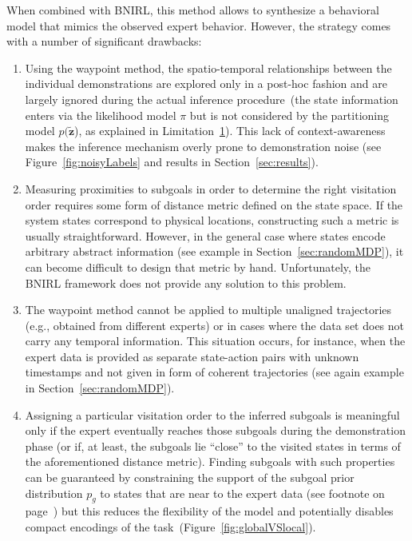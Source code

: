 \documentclass[twoside,11pt]{article}
\newcommand{\first}{(i)}
\newcommand{\second}{(ii)}
\newcommand{\third}{(iii)}
\newcommand{\fourth}{(iv)}
\newcommand{\eg}{e.g.}
\begin{document}
When combined with BNIRL, this method allows to synthesize a behavioral model that %
mimics the observed expert behavior. However, the strategy comes with a number of significant drawbacks: 
\begin{enumerate}
\item[\first] Using the waypoint method, the spatio-temporal %
%
relationships between the individual demonstrations are
explored only in a post-hoc fashion and %
are largely ignored during the actual inference procedure~(the state information enters via the likelihood model $\pi$ but is not considered by the partitioning %
model $p(\mathbf{\tilde{z}}$), as explained in Limitation~\hyperref[phantom:lim1]{1}). %
%
%
%
%
%
This lack of context-awareness makes the inference mechanism overly prone to demonstration noise (see Figure~\ref{fig:noisyLabels} and results in Section~\ref{sec:results}).
\item[\second] Measuring proximities to subgoals in order to determine the right visitation order requires some form of distance metric defined on the state space. If the system states correspond to physical locations, constructing such a metric is usually straightforward. However, in the general case where states encode arbitrary abstract information (see %
 example in Section~\ref{sec:randomMDP}), %
it can become difficult to design that metric by hand. Unfortunately, the BNIRL framework does not provide any %
solution to this problem. 
\item[\third] The waypoint method cannot be applied to multiple unaligned trajectories (\eg, obtained from different experts) or %
in cases where the data set does not carry any temporal information. This situation occurs, for instance, when %
the expert data is provided as separate state-action pairs with unknown timestamps and not given in form of coherent trajectories (see again example in Section~\ref{sec:randomMDP}). %
\item[\fourth] Assigning a particular visitation order to the inferred subgoals is meaningful only if the expert eventually reaches those subgoals during the demonstration phase (or if, at least, the subgoals lie ``close'' to the visited states in terms of the aforementioned distance metric). Finding subgoals with such properties can be guaranteed by constraining the support of the subgoal prior distribution $p_g$ to states that are near to the expert data (see footnote on page~\pageref{foot:conditioning}) but this %
reduces the flexibility of the model and potentially disables compact encodings of the task~(Figure~\ref{fig:globalVSlocal}).
\end{enumerate}
\end{document}

